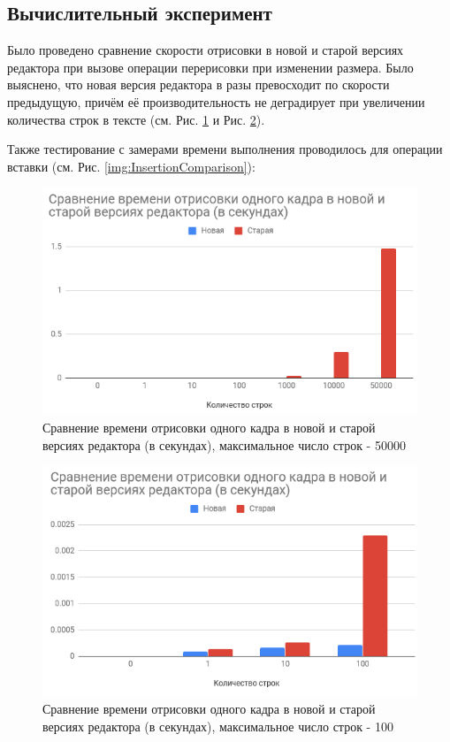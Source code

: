 \documentclass{fefu}
\begin{document}
		\subsection{Вычислительный эксперимент}
			\par Было проведено сравнение скорости отрисовки в новой и старой версиях 
			редактора при вызове операции перерисовки при изменении размера. Было выяснено, что 
			новая версия редактора в разы превосходит по скорости предыдущую, причём её 
			производительность не деградирует при увеличении количества строк в тексте (см. 
			Рис. \ref{img:RenderComparisonBig} и Рис. \ref{img:RenderComparisonSmall}).
			\par Также тестирование с замерами времени выполнения проводилось для операции 
			вставки (см. Рис. \ref{img:InsertionComparison}):
			\begin{figure}[h]
				\centering
				\includegraphics[width=0.8\linewidth]{images/RenderComparisonBig.png}
				\caption{Сравнение времени отрисовки одного кадра в новой и старой версиях 
				редактора (в секундах), максимальное число строк - 50000}
				\label{img:RenderComparisonBig}
			\end{figure}
			\begin{figure}[h]
				\centering
				\includegraphics[width=0.9\linewidth]{images/RenderComparisonSmall.png}
				\caption{Сравнение времени отрисовки одного кадра в новой и старой версиях 
				редактора (в секундах), максимальное число строк - 100}
				\label{img:RenderComparisonSmall}
			\end{figure}
\end{document}
